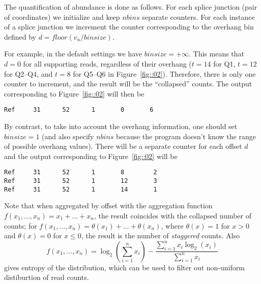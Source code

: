 \documentclass{article}
\begin{document}
The quantification of abundance is done as follows. For each splice junction (pair of coordinates) 
we initialize and keep $nbins$ separate counters. For each instance of a splice junction we increment 
the counter corresponding to the overhang bin defined by $d=floor(v_u/binsize)$.

For example, in the default settings we have $binsize=+\infty$. This means that $d=0$ for all supporting 
reads, regardless of their overhang ($t=14$ for Q1, $t=12$ for Q2--Q4, and $t=8$ for Q5--Q6 in 
Figure~\ref{fig::02}). Therefore, there is only one counter to increment, and the result will be the 
``collapsed'' counts. The output corresponding to Figure~\ref{fig::02} will then be
\begin{verbatim}
Ref     31      52      1       0       6
\end{verbatim}

By contrast, to take into account the overhang information, one should set $binsize=1$ (and also specify $nbins$ 
because the program doesn't know the range of possible overhang values). There will be a separate counter for each 
offset $d$ and the output corresponding to Figure~\ref{fig::02} will be
\begin{verbatim}
Ref     31      52      1       8        2
Ref     31      52      1       12       3
Ref     31      52      1       14       1
\end{verbatim}
Note that when aggregated by offset with the aggregation function $f(x_1,\dots,x_n) = x_1+\dots+x_n$, the result
coincides with the collapsed number of counts; for $f(x_1,\dots,x_n) = \theta(x_1)+\dots+\theta(x_n)$, where 
$\theta(x)=1$ for $x>0$ and $\theta(x)=0$ for $x\le0$, the result is the number of {\em staggered} counts.
Also $$f(x_1,\dots,x_n) = \log_2(\sum\limits_{i=1}^nx_i) - \frac{\sum\limits_{i=1}^nx_i\log_2(x_i)}{\sum\limits_{i=1}^nx_i}$$
gives entropy of the distribution, which can be used to filter out non-uniform distiburtion of read counts.



\end{document}
